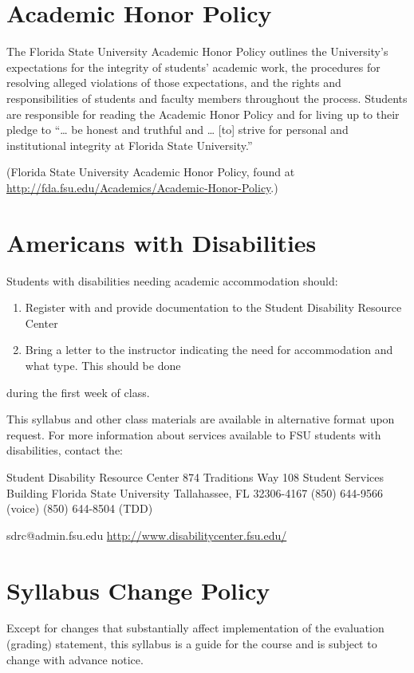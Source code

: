 \documentclass[11pt]{article}
\begin{document}
\section*{Academic Honor Policy}
\label{sec-8}

The Florida State University Academic Honor Policy outlines the University’s 
expectations for the integrity of students’ academic work, the procedures for 
resolving alleged violations of those expectations, and the rights and 
responsibilities of students and faculty members throughout the process. 
Students are responsible for reading the Academic Honor Policy and for living 
up to their pledge to “\ldots{} be honest and truthful and \ldots{} [to] strive for 
personal and institutional integrity at Florida State University.” 

(Florida State University Academic Honor Policy, found at
\url{http://fda.fsu.edu/Academics/Academic-Honor-Policy}.)

\section*{Americans with Disabilities}
\label{sec-9}

Students with disabilities needing academic accommodation should:

\begin{enumerate}
\item Register with and provide documentation to the Student Disability Resource Center
\item Bring a letter to the instructor indicating the need for accommodation and what type. This should be done
\end{enumerate}

during the first week of class.

This syllabus and other class materials are available in alternative format 
upon request. For more information about services available to FSU students 
with disabilities, contact the:

Student Disability Resource Center
874 Traditions Way
108 Student Services Building
Florida State University
Tallahassee, FL 32306-4167
(850) 644-9566 (voice)
(850) 644-8504 (TDD)

sdrc@admin.fsu.edu
\url{http://www.disabilitycenter.fsu.edu/}

\section*{Syllabus Change Policy}
\label{sec-10}

Except for changes that substantially affect implementation of the evaluation (grading)
statement, this syllabus is a guide for the course and is subject to change with advance notice.
\end{document}
